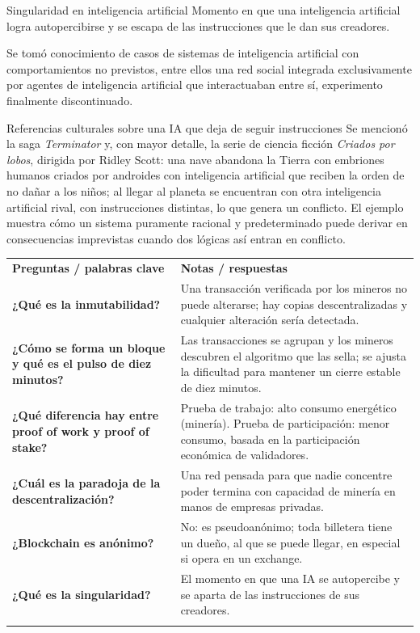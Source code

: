\documentclass[12pt,oneside]{book}
\newcommand{\cq}[1]{\textbf{#1}}
\newcommand{\cornell}[3]{%
  \par\medskip\noindent\begingroup
  \renewcommand{\arraystretch}{1.25}%
  \begin{tabularx}{\textwidth}{|>{\raggedright\arraybackslash}p{0.27\textwidth}|>{\raggedright\arraybackslash}X|}
    \hline
    \multicolumn{2}{|>{\centering\arraybackslash}X|}{\cellcolor{azulacad!12}\textbf{Cuadro Cornell --- #1}}\\ \hline
    \cellcolor{gray!10}\textbf{Preguntas / palabras clave} & \cellcolor{gray!10}\textbf{Notas / respuestas} \\ \hline
    #2
    \multicolumn{2}{|>{\raggedright\arraybackslash}X|}{\cellcolor{azulacad!6}\textbf{Resumen.} #3}\\ \hline
  \end{tabularx}%
  \endgroup\par\medskip}
\begin{document}
\begin{definition}{Singularidad en inteligencia artificial}
Momento en que una inteligencia artificial logra autopercibirse y se escapa de las instrucciones que le dan sus creadores.
\end{definition}

Se tomó conocimiento de casos de sistemas de inteligencia artificial con comportamientos no previstos, entre ellos una red social integrada exclusivamente por agentes de inteligencia artificial que interactuaban entre sí, experimento finalmente discontinuado.

\begin{example}{Referencias culturales sobre una IA que deja de seguir instrucciones}
Se mencionó la saga \emph{Terminator} y, con mayor detalle, la serie de ciencia ficción \emph{Criados por lobos}, dirigida por Ridley Scott: una nave abandona la Tierra con embriones humanos criados por androides con inteligencia artificial que reciben la orden de no dañar a los niños; al llegar al planeta se encuentran con otra inteligencia artificial rival, con instrucciones distintas, lo que genera un conflicto. El ejemplo muestra cómo un sistema puramente racional y predeterminado puede derivar en consecuencias imprevistas cuando dos lógicas así entran en conflicto.
\end{example}

\cornell{Blockchain: bloques, minería, billeteras e inteligencia artificial}{
\cq{¿Qué es la inmutabilidad?} & Una transacción verificada por los mineros no puede alterarse; hay copias descentralizadas y cualquier alteración sería detectada. \\ \hline
\cq{¿Cómo se forma un bloque y qué es el pulso de diez minutos?} & Las transacciones se agrupan y los mineros descubren el algoritmo que las sella; se ajusta la dificultad para mantener un cierre estable de diez minutos. \\ \hline
\cq{¿Qué diferencia hay entre proof of work y proof of stake?} & Prueba de trabajo: alto consumo energético (minería). Prueba de participación: menor consumo, basada en la participación económica de validadores. \\ \hline
\cq{¿Cuál es la paradoja de la descentralización?} & Una red pensada para que nadie concentre poder termina con capacidad de minería en manos de empresas privadas. \\ \hline
\cq{¿Blockchain es anónimo?} & No: es pseudoanónimo; toda billetera tiene un dueño, al que se puede llegar, en especial si opera en un exchange. \\ \hline
\cq{¿Qué es la singularidad?} & El momento en que una IA se autopercibe y se aparta de las instrucciones de sus creadores. \\ \hline
}{Blockchain sostiene la confianza mediante bloques inmutables cerrados por mineros, pero su descentralización tiene límites. La pseudoanonimización permite llegar al titular de una billetera, y la carrera tecnológica global suma el debate sobre la inteligencia artificial.}
\end{document}
